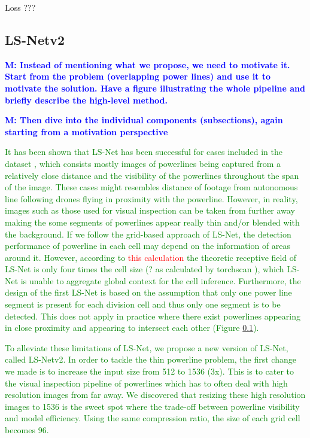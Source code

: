 \documentclass[journal]{IEEEtran}
\newcommand{\commentM}[1]{\textbf{\textcolor{blue}{M: #1}}}
\begin{document}
Loss ???

\subsection{LS-Netv2}
\commentM{Instead of mentioning what we propose, we need to motivate it. Start from the problem (overlapping power lines) and use it to motivate the solution. Have a figure illustrating the whole pipeline and briefly describe the high-level method.}

\commentM{Then dive into the individual components (subsections), again starting from a motivation perspective}

\textcolor{green}{It has been shown that LS-Net has been successful for cases included in the dataset \cite{}, which consists mostly images of powerlines being captured from a relatively close distance and the visibility of the powerlines throughout the span of the image. These cases might resembles distance of footage from autonomous line following drones flying in proximity with the powerline. However, in reality, images such as those used for visual inspection can be taken from further away making the some segments of powerlines appear really thin and/or blended with the background. If we follow the grid-based approach of LS-Net, the detection performance of powerline in each cell may depend on the information of areas around it. However, according to \textcolor{red}{this calculation} the theoretic receptive field of LS-Net is only four times the cell size (? as calculated by torchscan \cite{torchscan}), which LS-Net is unable to aggregate global context for the cell inference. Furthermore, the design of the first LS-Net is based on the assumption that only one power line segment is present for each division cell and thus only one segment is to be detected. This does not apply in practice where there exist powerlines appearing in close proximity and appearing to intersect each other (Figure \ref{}).}

\textcolor{green}{To alleviate these limitations of LS-Net, we propose a new version of LS-Net, called LS-Netv2. In order to tackle the thin powerline problem, the first change we made is to increase the input size from 512 to 1536 (3x). This is to cater to the visual inspection pipeline of powerlines which has to often deal with high resolution images from far away. We discovered that resizing these high resolution images to 1536 is the sweet spot where the trade-off between powerline visibility and model efficiency. Using the same compression ratio, the size of each grid cell becomes 96.}
\end{document}
